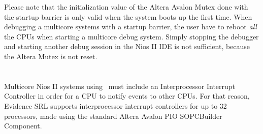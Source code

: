\begin{warning}
Please note that the initialization value of the Altera Avalon Mutex
done with the startup barrier is only valid when the system boots up
the first time. When debugging a multicore systems with a startup
barrier, the user have to reboot {\em all} the
CPUs when starting a multicore debug system. Simply stopping the
debugger and starting another debug session in the Nios II IDE is not
sufficient, because the Altera Mutex is not reset.
\end{warning}













\section{}
\label{sec:interprocessor-interrupt}

Multicore Nios II systems using \ee\ must include an Interprocessor
Interrupt Controller in order for a CPU to notify events to other
CPUs. For that reason, Evidence SRL supports interprocessor interrupt
controllers for up to 32 processors, made using the standard Altera
Avalon PIO SOPCBuilder Component.

